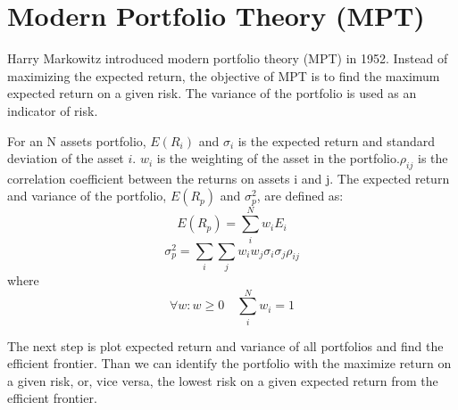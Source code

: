 \section{Modern Portfolio Theory (MPT)}
Harry Markowitz introduced modern portfolio theory (MPT) in 1952. Instead of maximizing the expected return, the objective of MPT is to find the maximum expected return on a given risk. The variance of the portfolio is used as an indicator of risk\cite{10.2307/2975974}. 
\par
For an N assets portfolio, \(E(R_i)\) and  \(\sigma_i\) is the expected return and standard deviation of the asset \(i\). \(w_i\) is the weighting of the asset in the portfolio.\(\rho_{ij}\) is the correlation coefficient between the returns on assets i and j.
The expected return and variance of the portfolio, \(E(R_p)\) and \(\sigma_p^2\), are defined as:
\[E(R_p) = \sum_i^N w_i E_i\]
\[\sigma_p^2 = \sum_i \sum_j w_i w_j \sigma_i \sigma_j \rho_{ij}\]
where
\[\forall w: w \geq 0 \quad \sum_i ^N w_i = 1\]
\par
The next step is plot expected return and variance of all portfolios and find the efficient frontier. Than we can identify the portfolio with the maximize return on a given risk, or, vice versa, the lowest risk on a given expected return from the efficient frontier.